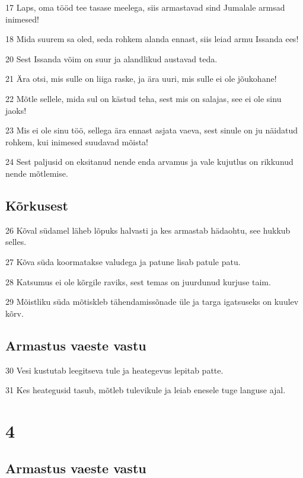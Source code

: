 \par 17 Laps, oma tööd tee tasase meelega, siis armastavad sind Jumalale armsad inimesed!
\par 18 Mida suurem sa oled, seda rohkem alanda ennast, siis leiad armu Issanda ees!
\par 20 Sest Issanda võim on suur ja alandlikud austavad teda.
\par 21 Ära otsi, mis sulle on liiga raske, ja ära uuri, mis sulle ei ole jõukohane!
\par 22 Mõtle sellele, mida sul on kästud teha, sest mis on salajas, see ei ole sinu jaoks!
\par 23 Mis ei ole sinu töö, sellega ära ennast asjata vaeva, sest sinule on ju näidatud rohkem, kui inimesed suudavad mõista!
\par 24 Sest paljusid on eksitanud nende enda arvamus ja vale kujutlus on rikkunud nende mõtlemise.

\section*{Kõrkusest}

\par 26 Kõval südamel läheb lõpuks halvasti ja kes armastab hädaohtu, see hukkub selles.
\par 27 Kõva süda koormatakse valudega ja patune lisab patule patu.
\par 28 Katsumus ei ole kõrgile raviks, sest temas on juurdunud kurjuse taim.
\par 29 Mõistliku süda mõtiskleb tähendamissõnade üle ja targa igatsuseks on kuulev kõrv.

\section*{Armastus vaeste vastu}

\par 30 Vesi kustutab leegitseva tule ja heategevus lepitab patte.
\par 31 Kes heategusid tasub, mõtleb tulevikule ja leiab enesele tuge languse ajal.

\chapter{4}

\section*{Armastus vaeste vastu}

